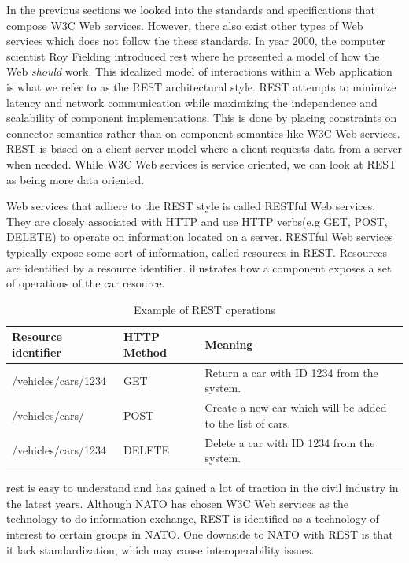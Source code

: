 In the previous sections we looked into the standards and specifications that
compose W3C Web services. However, there also exist other types of Web services
which does not follow the these standards. In year 2000, the computer scientist
Roy Fielding introduced \gls{rest} where he presented a model of how the Web
\textit{should} work. This idealized model of interactions within a Web
application\cite{rest-fielding} is what we refer to as the REST architectural
style. REST attempts to minimize latency and network communication while
maximizing the independence and scalability of component implementations. This
is done by placing constraints on connector semantics rather than on component
semantics like W3C Web services.  REST is based on a client-server model where a
client requests data from a server when needed. While W3C Web services is
service oriented, we can look at REST as being more data oriented.

Web services that adhere to the REST style is called RESTful Web services. They
are closely associated with HTTP and use HTTP verbs(e.g GET, POST, DELETE) to
operate on information located on a server. RESTful Web services typically
expose some sort of information, called resources in REST. Resources are
identified by a resource identifier.  illustrates how a
component exposes a set of operations of the car resource.

 \begin{table}[h]
 \begin{tabularx}{\textwidth}{| X | X | X |}
 \hline
   \textbf{Resource identifier} & \textbf{HTTP Method}  & \textbf{Meaning}\\ \hline
   /vehicles/cars/1234 & GET & Return a car with ID 1234 from the system. \\ \hline
   /vehicles/cars/ & POST & Create a new car which will be added to the list of cars. \\ \hline
   /vehicles/cars/1234 & DELETE & Delete a car with ID 1234 from the system. \\ \hline
 \end{tabularx}
 \caption{Example of REST operations}
 \label{table-rest}
 \end{table}

 \gls{rest} is easy to understand and has gained a lot of traction in the civil
 industry in the latest years. Although NATO has chosen W3C Web services as the
 technology to do information-exchange, REST is identified as a technology of
 interest to certain groups in
 NATO\cite{johnsen-bloebaum-recommendations-web-services-tactical-domain}. One
 downside to NATO with REST is that it lack standardization, which may cause
 interoperability issues.

